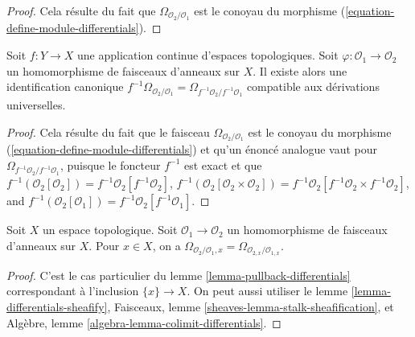\begin{proof}
Cela résulte du fait que $\Omega_{\mathcal{O}_2/\mathcal{O}_1}$ est le
conoyau du morphisme (\ref{equation-define-module-differentials}).
\end{proof}

\begin{lemma}
\label{lemma-pullback-differentials}
Soit $f : Y \to X$ une application continue d'espaces topologiques.
Soit $\varphi : \mathcal{O}_1 \to \mathcal{O}_2$ un homomorphisme de
faisceaux d'anneaux sur $X$. Il existe alors une identification canonique
$f^{-1}\Omega_{\mathcal{O}_2/\mathcal{O}_1} =
\Omega_{f^{-1}\mathcal{O}_2/f^{-1}\mathcal{O}_1}$
compatible aux dérivations universelles.
\end{lemma}

\begin{proof}
Cela résulte du fait que le faisceau
$\Omega_{\mathcal{O}_2/\mathcal{O}_1}$ est le conoyau du morphisme
(\ref{equation-define-module-differentials}) et qu'un énoncé analogue vaut
pour $\Omega_{f^{-1}\mathcal{O}_2/f^{-1}\mathcal{O}_1}$, puisque le foncteur
$f^{-1}$ est exact et que
$f^{-1}(\mathcal{O}_2[\mathcal{O}_2]) =
f^{-1}\mathcal{O}_2[f^{-1}\mathcal{O}_2]$,
$f^{-1}(\mathcal{O}_2[\mathcal{O}_2 \times \mathcal{O}_2]) =
f^{-1}\mathcal{O}_2[f^{-1}\mathcal{O}_2 \times f^{-1}\mathcal{O}_2]$, and
$f^{-1}(\mathcal{O}_2[\mathcal{O}_1]) =
f^{-1}\mathcal{O}_2[f^{-1}\mathcal{O}_1]$.
\end{proof}

\begin{lemma}
\label{lemma-stalk-module-differentials}
Soit $X$ un espace topologique. Soit
$\mathcal{O}_1 \to \mathcal{O}_2$ un homomorphisme de faisceaux d'anneaux
sur $X$. Pour $x \in X$, on a
$\Omega_{\mathcal{O}_2/\mathcal{O}_1, x} =
\Omega_{\mathcal{O}_{2, x}/\mathcal{O}_{1, x}}$.
\end{lemma}

\begin{proof}
C'est le cas particulier du lemme \ref{lemma-pullback-differentials}
correspondant à l'inclusion $\{x\} \to X$. On peut aussi utiliser le lemme
\ref{lemma-differentials-sheafify}, Faisceaux, lemme
\ref{sheaves-lemma-stalk-sheafification}, et Algèbre, lemme
\ref{algebra-lemma-colimit-differentials}.
\end{proof}


